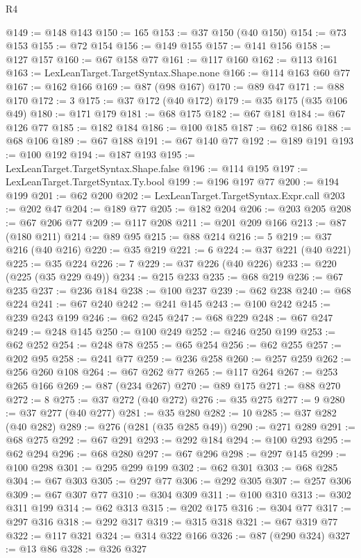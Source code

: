 \begin{lexlean}{R4}
\begin{coremodule}
@149 := @148 @143
@150 := 165
@153 := @37 @150 (@40 @150)
@154 := @73 @153
@155 := @72 @154
@156 := @149 @155
@157 := @141 @156
@158 := @127 @157
@160 := @67 @158 @77
@161 := @117 @160
@162 := @113 @161
@163 := LexLeanTarget.TargetSyntax.Shape.none
@166 := @114 @163 @60 @77
@167 := @162 @166
@169 := @87 (@98 @167)
@170 := @89 @47
@171 := @88 @170
@172 := 3
@175 := @37 @172 (@40 @172)
@179 := @35 @175 (@35 @106 @49)
@180 := @171 @179
@181 := @68 @175
@182 := @67 @181
@184 := @67 @126 @77
@185 := @182 @184
@186 := @100 @185
@187 := @62 @186
@188 := @68 @106
@189 := @67 @188
@191 := @67 @140 @77
@192 := @189 @191
@193 := @100 @192
@194 := @187 @193
@195 := LexLeanTarget.TargetSyntax.Shape.false
@196 := @114 @195
@197 := LexLeanTarget.TargetSyntax.Ty.bool
@199 := @196 @197 @77
@200 := @194 @199
@201 := @62 @200
@202 := LexLeanTarget.TargetSyntax.Expr.call
@203 := @202 @47
@204 := @189 @77
@205 := @182 @204
@206 := @203 @205
@208 := @67 @206 @77
@209 := @117 @208
@211 := @201 @209 @166
@213 := @87 (@180 @211)
@214 := @89 @95
@215 := @88 @214
@216 := 5
@219 := @37 @216 (@40 @216)
@220 := @35 @219
@221 := 6
@224 := @37 @221 (@40 @221)
@225 := @35 @224
@226 := 7
@229 := @37 @226 (@40 @226)
@233 := @220 (@225 (@35 @229 @49))
@234 := @215 @233
@235 := @68 @219
@236 := @67 @235
@237 := @236 @184
@238 := @100 @237
@239 := @62 @238
@240 := @68 @224
@241 := @67 @240
@242 := @241 @145
@243 := @100 @242
@245 := @239 @243 @199
@246 := @62 @245
@247 := @68 @229
@248 := @67 @247
@249 := @248 @145
@250 := @100 @249
@252 := @246 @250 @199
@253 := @62 @252
@254 := @248 @78
@255 := @65 @254
@256 := @62 @255
@257 := @202 @95
@258 := @241 @77
@259 := @236 @258
@260 := @257 @259
@262 := @256 @260 @108
@264 := @67 @262 @77
@265 := @117 @264
@267 := @253 @265 @166
@269 := @87 (@234 @267)
@270 := @89 @175
@271 := @88 @270
@272 := 8
@275 := @37 @272 (@40 @272)
@276 := @35 @275
@277 := 9
@280 := @37 @277 (@40 @277)
@281 := @35 @280
@282 := 10
@285 := @37 @282 (@40 @282)
@289 := @276 (@281 (@35 @285 @49))
@290 := @271 @289
@291 := @68 @275
@292 := @67 @291
@293 := @292 @184
@294 := @100 @293
@295 := @62 @294
@296 := @68 @280
@297 := @67 @296
@298 := @297 @145
@299 := @100 @298
@301 := @295 @299 @199
@302 := @62 @301
@303 := @68 @285
@304 := @67 @303
@305 := @297 @77
@306 := @292 @305
@307 := @257 @306
@309 := @67 @307 @77
@310 := @304 @309
@311 := @100 @310
@313 := @302 @311 @199
@314 := @62 @313
@315 := @202 @175
@316 := @304 @77
@317 := @297 @316
@318 := @292 @317
@319 := @315 @318
@321 := @67 @319 @77
@322 := @117 @321
@324 := @314 @322 @166
@326 := @87 (@290 @324)
@327 := @13 @86
@328 := @326 @327

\end{coremodule}
\end{lexlean}
